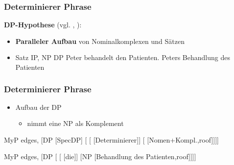 
\begin{frame}
\frametitle{Determinierer Phrase}

\textbf{DP-Hypothese} (vgl. \citealt{Abney87x}, \citealt{Brame82a}):
		\begin{itemize}
			\item \textbf{Paralleler Aufbau} von Nominalkomplexen und Sätzen
			\item Satz \ras IP, NP \ras DP
			\eal
			\ex Peter behandelt den Patienten.
			\ex Peters Behandlung des Patienten
			\zl
			
		\end{itemize}

\end{frame}


\begin{frame}
\frametitle{Determinierer Phrase}

\begin{itemize}
	\item Aufbau der DP
	\begin{itemize}
		\item {} nimmt eine NP als Komplement
	\end{itemize}
\end{itemize}


\begin{minipage}[b]{0.48\textwidth}
	\centering
	\footnotesize{
		\begin{forest}
		MyP edges,
		[DP [SpecDP]
			[ 	[ [Determinierer]]
						[ [Nomen+Kompl.,roof]]]]
		\end{forest}
		}
\end{minipage}  
%
%            
\begin{minipage}[b]{0.48\textwidth}
	\centering
	\footnotesize{
		\begin{forest}
		MyP edges,
		[DP [ 	[ [die]]
						[NP [Behandlung des Patienten,roof]]]]
		\end{forest}
		}
\end{minipage}  
 
\end{frame}


